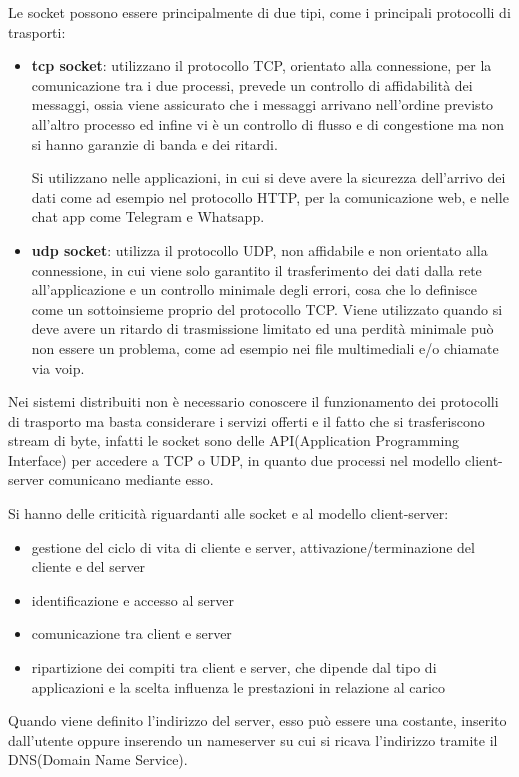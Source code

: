 \documentclass[a4paper,12pt, oneside]{book}
\begin{document}
Le socket possono essere principalmente di due tipi, come i principali protocolli di trasporti:
\begin{itemize}
    \item \textbf{tcp socket}: utilizzano il protocollo TCP, orientato alla connessione,
        per la comunicazione tra i due processi, prevede un controllo di affidabilità dei messaggi,
        ossia viene assicurato che i messaggi arrivano nell'ordine previsto all'altro processo
        ed infine vi è un controllo di flusso e di congestione ma non si hanno garanzie di banda e dei ritardi.

        Si utilizzano nelle applicazioni, in cui si deve avere la sicurezza dell'arrivo dei dati come ad
        esempio nel protocollo HTTP, per la comunicazione web, e nelle chat app come Telegram e Whatsapp.

    \item \textbf{udp socket}: utilizza il protocollo UDP, non affidabile e non orientato alla connessione,
        in cui viene solo garantito il trasferimento dei dati dalla rete all'applicazione e un controllo 
        minimale degli errori, cosa che lo definisce come un sottoinsieme proprio del protocollo TCP.\newline
        Viene utilizzato quando si deve avere un ritardo di trasmissione limitato ed una perdità minimale
        può non essere un problema, come ad esempio nei file multimediali e/o chiamate via voip.
\end{itemize}
Nei sistemi distribuiti non è necessario conoscere il funzionamento dei protocolli di trasporto ma basta
considerare i servizi offerti e il fatto che si trasferiscono stream di byte, infatti
le socket sono delle API(Application Programming Interface) per accedere a TCP o UDP, in quanto due processi
nel modello client-server comunicano mediante esso.

Si hanno delle criticità riguardanti alle socket e al modello client-server:
\begin{itemize}
    \item gestione del ciclo di vita di cliente e server, attivazione/terminazione del cliente e del server
    \item identificazione e accesso al server
    \item comunicazione tra client e server
    \item ripartizione dei compiti tra client e server, che dipende dal tipo di applicazioni 
          e la scelta influenza le prestazioni in relazione al carico
\end{itemize}
Quando viene definito l'indirizzo del server, esso può essere una costante, inserito dall'utente oppure
inserendo un nameserver su cui si ricava l'indirizzo tramite il DNS(Domain Name Service).
\end{document}
